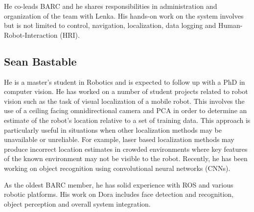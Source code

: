 He co-leads BARC and he shares responsibilities in administration and organization of the team with Lenka. His hands-on work on the system involves but is not limited to control, navigation, localization, data logging and Human-Robot-Interaction (HRI).




\subsection{Sean Bastable}

He is a master's student in Robotics and is expected to follow up with a PhD in computer vision. He has worked on a number of student projects related to robot vision such as the task of visual localization of a mobile robot. This involves the use of a ceiling facing omnidirectional camera and PCA in order to determine an estimate of the robot's location relative to a set of training data. This approach is particularly useful in situations when other localization methods may be unavailable or unreliable. For example, laser based localization methods may produce incorrect location estimates in crowded environments where key features of the known environment may not be visible to the robot. Recently, he has been working on object recognition using convolutional neural networks (CNNs).


As the oldest BARC member, he has solid experience with ROS and various robotic platforms. His work on Dora includes face detection and recognition, object perception and overall system integration.